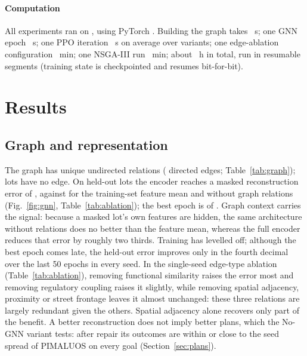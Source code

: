 \documentclass[preprint,12pt]{elsarticle}
\begin{document}
\paragraph{Computation} All experiments ran on \Hardware{}, using PyTorch \TorchVersion{}. Building the graph takes \TimeGraphS{}~s; one GNN epoch \GnnSecPerEpoch{}~s; one PPO iteration \MarlSecPerIter{}~s on average over variants; one edge-ablation configuration \AblMinPerConfig{}~min; one NSGA-III run \ParetoMinPerRun{}~min; about \TimeTotalH{}~h in total, run in resumable segments (training state is checkpointed and resumes bit-for-bit).

\section{Results}

\subsection{Graph and representation}
The graph has \NEdgesUndirected{} unique undirected relations (\NEdgesDirected{} directed edges; Table~\ref{tab:graph}); \NIsolated{} lots have no edge. On held-out lots the encoder reaches a masked reconstruction error of \GnnValLoss{}, against \GnnMeanPredLoss{} for the training-set feature mean and \GnnNoGraphLoss{} without graph relations (Fig.~\ref{fig:gnn}, Table~\ref{tab:ablation}); the best epoch is \GnnBestEpoch{} of \GnnEpochs{}.
Graph context carries the signal: because a masked lot's own features are hidden, the same architecture without relations does no better than the feature mean, whereas the full encoder reduces that error by roughly two thirds. Training has levelled off; although the best epoch comes late, the held-out error improves only in the fourth decimal over the last 50 epochs in every seed. In the single-seed edge-type ablation (Table~\ref{tab:ablation}), removing functional similarity raises the error most and removing regulatory coupling raises it slightly, while removing spatial adjacency, proximity or street frontage leaves it almost unchanged: these three relations are largely redundant given the others. Spatial adjacency alone recovers only part of the benefit. A better reconstruction does not imply better plans, which the No-GNN variant tests: after repair its outcomes are within or close to the seed spread of PIMALUOS on every goal (Section~\ref{sec:plans}).
\end{document}

